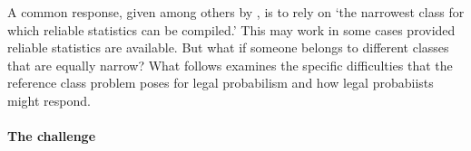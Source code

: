 \documentclass{article}
\begin{document}
%
A common response, given among others by \citet[374]{Reichenbach1949}, is to rely on `the narrowest class for which reliable statistics can be compiled.' This may work in some cases provided reliable statistics are available. 
But what if someone belongs to different classes that are equally narrow? 
%
%
%
What follows examines the specific difficulties that the reference class problem poses 
for legal probabilism and how legal probabiists might respond.

\paragraph{The challenge}
 
\end{document}
